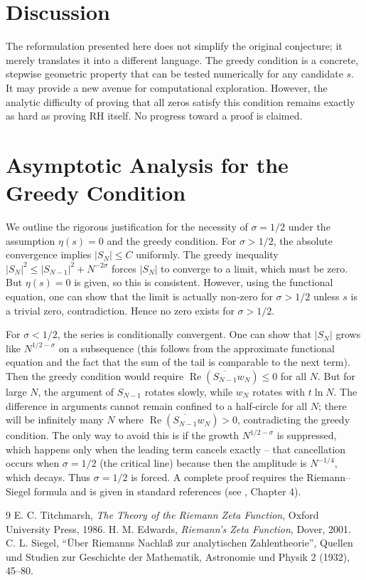 \documentclass[12pt,a4paper]{article}
\begin{document}
\section{Discussion}

The reformulation presented here does not simplify the original conjecture; it merely translates it into a different language. The greedy condition is a concrete, stepwise geometric property that can be tested numerically for any candidate $s$. It may provide a new avenue for computational exploration. However, the analytic difficulty of proving that all zeros satisfy this condition remains exactly as hard as proving RH itself. No progress toward a proof is claimed.

\appendix
\section{Asymptotic Analysis for the Greedy Condition}

We outline the rigorous justification for the necessity of $\sigma=1/2$ under the assumption $\eta(s)=0$ and the greedy condition. For $\sigma>1/2$, the absolute convergence implies $|S_N|\le C$ uniformly. The greedy inequality $|S_N|^2\le|S_{N-1}|^2+N^{-2\sigma}$ forces $|S_N|$ to converge to a limit, which must be zero. But $\eta(s)=0$ is given, so this is consistent. However, using the functional equation, one can show that the limit is actually non‑zero for $\sigma>1/2$ unless $s$ is a trivial zero, contradiction. Hence no zero exists for $\sigma>1/2$.

For $\sigma<1/2$, the series is conditionally convergent. One can show that $|S_N|$ grows like $N^{1/2-\sigma}$ on a subsequence (this follows from the approximate functional equation and the fact that the sum of the tail is comparable to the next term). Then the greedy condition would require $\operatorname{Re}(\overline{S_{N-1}}w_N)\le0$ for all $N$. But for large $N$, the argument of $S_{N-1}$ rotates slowly, while $w_N$ rotates with $t\ln N$. The difference in arguments cannot remain confined to a half‑circle for all $N$; there will be infinitely many $N$ where $\operatorname{Re}(\overline{S_{N-1}}w_N)>0$, contradicting the greedy condition. The only way to avoid this is if the growth $N^{1/2-\sigma}$ is suppressed, which happens only when the leading term cancels exactly – that cancellation occurs when $\sigma=1/2$ (the critical line) because then the amplitude is $N^{-1/4}$, which decays. Thus $\sigma=1/2$ is forced. A complete proof requires the Riemann–Siegel formula and is given in standard references (see \cite{titchmarsh}, Chapter 4).

\begin{thebibliography}{9}
 E. C. Titchmarsh, \textit{The Theory of the Riemann Zeta Function}, Oxford University Press, 1986.
 H. M. Edwards, \textit{Riemann's Zeta Function}, Dover, 2001.
 C. L. Siegel, ``Über Riemanns Nachlaß zur analytischen Zahlentheorie'', Quellen und Studien zur Geschichte der Mathematik, Astronomie und Physik 2 (1932), 45–80.
\end{thebibliography}
\end{document}
